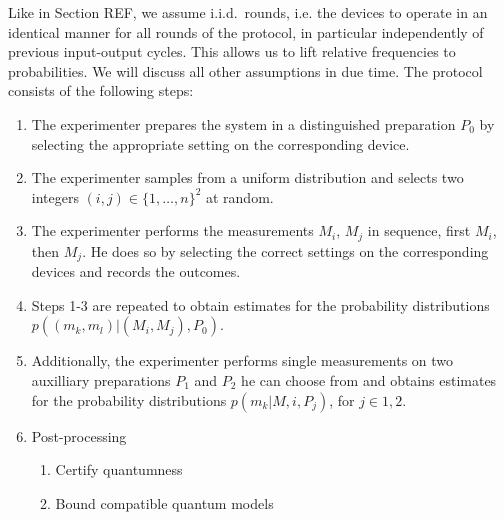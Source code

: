 Like in Section REF, we assume i.i.d.\ rounds, i.e. the devices to operate in an identical manner for all rounds of the protocol, in particular independently of previous input-output cycles. This allows us to lift relative frequencies to probabilities. We will discuss all other assumptions in due time. The protocol consists of the following steps:
\begin{enumerate}
\item The experimenter prepares the system in a distinguished preparation $P_0$ by selecting the appropriate setting on the corresponding device.
\item The experimenter samples from a uniform distribution and selects two integers $(i,j)\in\{1,\dots,n\}^2$ at random.
\item The experimenter performs the measurements $M_i$, $M_j$ in sequence, first $M_i$, then $M_j$. He does so by selecting the correct settings on the corresponding devices and records the outcomes.
\item Steps 1-3 are repeated to obtain estimates for the probability distributions $p((m_k,m_l)\vert (M_i,M_j),P_0)$. 
\item Additionally, the experimenter performs single measurements on two auxilliary preparations $P_1$ and $P_2$ he can choose from and obtains estimates for the probability distributions $p(m_k\vert M,i, P_j)$, for $j\in{1,2}$.
\item Post-processing
	\begin{enumerate}
	\item Certify quantumness
	\item Bound compatible quantum models
	\end{enumerate}
\end{enumerate}

